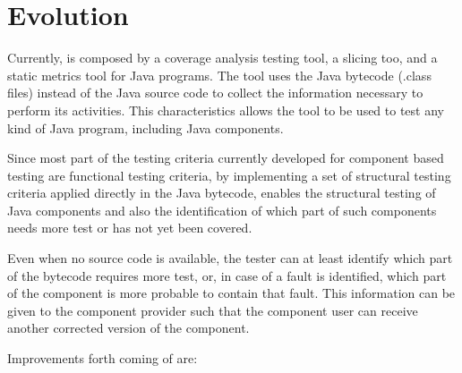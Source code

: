 
\section{\toolname Evolution}\label{sec:evolution}

Currently, \toolname is composed by a coverage analysis testing
tool, a slicing too, and a static metrics tool for Java programs.
The tool uses the Java bytecode (.class files) instead of the Java
source code to collect the information necessary to perform its
activities. This characteristics allows the tool to be used to
test any kind of Java program, including Java components.

Since most part of the testing criteria currently developed for
component based testing are functional testing criteria, by
implementing a set of structural testing criteria applied directly
in the Java bytecode, \toolname enables the structural testing of
Java components and also the identification of which part of such
components needs more test or has not yet been covered.

Even when no source code is available, the tester can at least
identify which part of the bytecode requires more test, or, in
case of a fault is identified, which part of the component is more
probable to contain that fault. This information can be given to
the component provider such that the component user can receive
another corrected version of the component.

Improvements forth coming of \toolname are:


